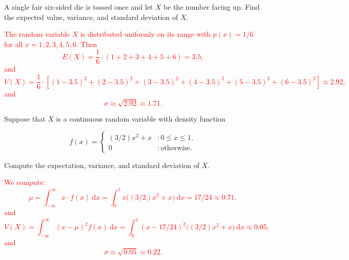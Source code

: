 \documentclass[12pt,reqno]{amsart}
\begin{document}
\bigskip
\prob A single fair six-sided die is tossed once and let $X$ be the number facing up. Find the expected value, variance, and standard deviation of $X$.

\bigskip
\textcolor{red}{The random variable $X$ is distributed uniformly on its range with $p(x) = 1/6$ for all $x=1,2,3,4,5,6$. Then
	\[
	E(X) = \frac{1}{6} \cdot (1+2+3+4+5+6) = 3.5,
	\]
and
	\[
	V(X) = \frac{1}{6}\cdot \left[ (1-3.5)^2 + (2-3.5)^2 + (3-3.5)^2 + (4-3.5)^2 + (5-3.5)^2 + (6-3.5)^2\right] \approx 2.92,
	\]
and
	\[
	\sigma \approx \sqrt{2.92} \approx 1.71.
	\]}



















\bigskip
\prob Suppose that $X$ is a continuous random variable with density function
	
	\[
	f(x) = \begin{cases}
	(3/2)x^2 + x & : 0\leq x \leq 1, \\
	0 & : \text{otherwise}.
	\end{cases}
	\]

Compute the expectation, variance, and standard deviation of $X$.

\bigskip
\textcolor{red}{We compute:
	\[
	\mu = \int_{-\infty}^\infty x\cdot f(x) \ \text{d} x = \int_0^1 x\big((3/2)x^2+x \big) \ \text{d} x = 17/24 \approx 0.71,
	\]
and
	\[
	V(X) = \int_{-\infty}^\infty (x-\mu)^2f(x) \ \text{d} x = \int_0^1 (x-17/24)^2 \big( (3/2)x^2+x\big) \ \text{d}x \approx 0.05,
	\]
and
	\[
	\sigma \approx \sqrt{0.05} \approx 0.22.
	\]}












\bigskip
\prob
\end{document}
